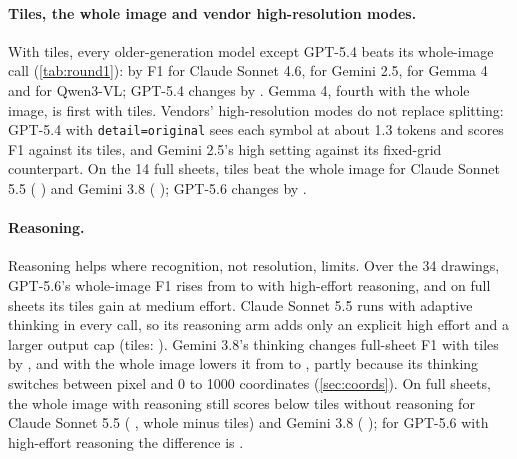 \paragraph{Tiles, the whole image and vendor high-resolution modes.} With tiles, every older-generation model except GPT-5.4 beats its whole-image call (\cref{tab:round1}): by \CDMinusATwosonnetFourSix{} \CDMinusATwosonnetFourSixCI{} F1 for Claude Sonnet 4.6, \CDMinusATwogeminiTwoFive{} \CDMinusATwogeminiTwoFiveCI{} for Gemini 2.5, \CDMinusATwogemmaFour{} \CDMinusATwogemmaFourCI{} for Gemma 4 and \CDMinusATwoqwenThreevl{} \CDMinusATwoqwenThreevlCI{} for Qwen3-VL; GPT-5.4 changes by \CDMinusATwogptFiveFour{} \CDMinusATwogptFiveFourCI. Gemma 4, fourth with the whole image, is first with tiles. Vendors' high-resolution modes do not replace splitting: GPT-5.4 with \texttt{detail=original} sees each symbol at about 1.3 tokens and scores \CBMinusDgptFiveFour{} \CBMinusDgptFiveFourCI{} F1 against its tiles, and Gemini 2.5's high setting \CBMinusDgeminiTwoFive{} \CBMinusDgeminiTwoFiveCI{} against its fixed-grid counterpart. On the 14 full sheets, tiles beat the whole image for Claude Sonnet 5.5 (\CDMinusATwosheetssonnetFiveFive{} \CDMinusATwosheetssonnetFiveFiveCI) and Gemini 3.8 (\CDMinusATwosheetsgemThreeEight{} \CDMinusATwosheetsgemThreeEightCI); GPT-5.6 changes by \CDMinusATwosheetsgptFiveSix{} \CDMinusATwosheetsgptFiveSixCI.

\paragraph{Reasoning.} Reasoning helps where recognition, not resolution, limits. Over the 34 drawings, GPT-5.6's whole-image F1 rises from \XplainFgptFiveSixrAll{} to \XrsnFgptFiveSixrAll{} with high-effort reasoning, and on full sheets its tiles gain \XnDRDgptFiveSix{} \XnDRDgptFiveSixCI{} at medium effort. Claude Sonnet 5.5 runs with adaptive thinking in every call, so its reasoning arm adds only an explicit high effort and a larger output cap (tiles: \XnDRDsonnetFiveFive{} \XnDRDsonnetFiveFiveCI). Gemini 3.8's thinking changes full-sheet F1 with tiles by \XnDRDgemThreeEight{} \XnDRDgemThreeEightCI, and with the whole image lowers it from \XplainFgemThreeEighttAll{} to \XrsnFgemThreeEighttAll, partly because its thinking switches between pixel and 0 to 1000 coordinates (\cref{sec:coords}). On full sheets, the whole image with reasoning still scores below tiles without reasoning for Claude Sonnet 5.5 (\XrsnMinusDsonnetFiveFivetSheets{} \XrsnMinusDCIsonnetFiveFivetSheets, whole minus tiles) and Gemini 3.8 (\XrsnMinusDgemThreeEighttSheets{} \XrsnMinusDCIgemThreeEighttSheets); for GPT-5.6 with high-effort reasoning the difference is \XrsnMinusDgptFiveSixrSheets{} \XrsnMinusDCIgptFiveSixrSheets.

